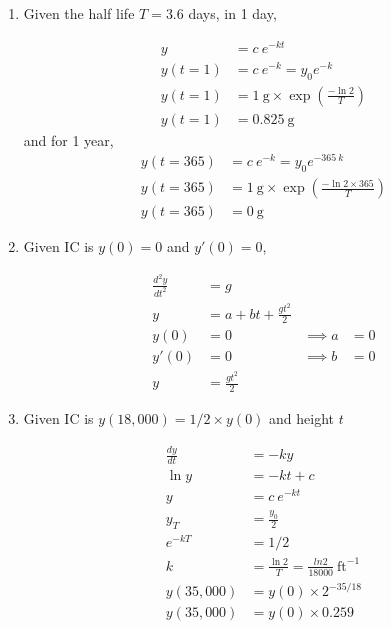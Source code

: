 \begin{enumerate}
    \item Given the half life $ T = 3.6 $ days, in 1 day,

          \begin{align}
              y        & = c\ e^{-kt}                                               \\
              y(t = 1) & = c\ e^{-k} = y_{0} e ^{-k}                                \\
              y(t = 1) & = 1\ \mathrm{g} \times \exp \left(\frac{- \ln 2}{T}\right) \\
              y(t = 1) & = 0.825\ \mathrm{g}
          \end{align}
          and for 1 year,
          \begin{align}
              y(t = 365) & = c\ e^{-k} = y_{0} e ^{-365\ k}                                      \\
              y(t = 365) & = 1\ \mathrm{g} \times \exp \left(\frac{- \ln 2 \times 365}{T}\right) \\
              y(t = 365) & = 0\ \mathrm{g}
          \end{align}


    \item Given IC is $y(0) = 0$ and $y'(0) = 0$,

          \begin{align}
              \frac{d^{2}y}{dt^{2}} & = g                                            \\
              y                     & = a + bt + \frac{gt^{2}}{2}                    \\
              y(0)                  & = 0                         & \implies a & = 0 \\
              y'(0)                 & = 0                         & \implies b & = 0 \\
              y                     & = \frac{gt^{2}}{2}
          \end{align}


    \item Given IC is $y(18,000) = 1/2 \times y(0)$ and height $t$

          \begin{align}
              \frac{dy}{dt} & = -ky                                                     \\
              \ln y         & = -kt + c                                                 \\
              y             & = c \ e^{-kt}                                             \\
              y_{T}         & = \frac{y_{0}}{2}                                         \\
              e^{-kT}       & = 1/2                                                     \\
              k             & = \frac{\ln 2}{T} = \frac{ln 2}{18000}\  \mathrm{ft}^{-1} \\
              y(35,000)     & = y(0) \times 2^{-35/18}                                  \\
              y(35,000)     & = y(0) \times 0.259
          \end{align}

\end{enumerate}

